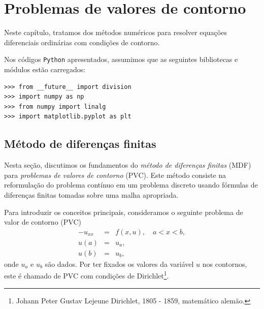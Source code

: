
%

\chapter{Problemas de valores de contorno}

Neste capítulo, tratamos dos métodos numéricos para resolver equações diferenciais ordinárias com condições de contorno.

\ifispython
Nos códigos \verb+Python+ apresentados, assumimos que as seguintes bibliotecas e módulos estão carregados:
\begin{verbatim}
>>> from __future__ import division
>>> import numpy as np
>>> from numpy import linalg
>>> import matplotlib.pyplot as plt
\end{verbatim}
\fi

\section{Método de diferenças finitas}

Nesta seção, discutimos os fundamentos do \emph{método de diferenças finitas} (MDF) para \emph{problemas de valores de contorno} (PVC). Este método consiste na reformulação do problema contínuo em um problema discreto usando fórmulas de diferenças finitas tomadas sobre uma malha apropriada.

Para introduzir os conceitos principais, consideramos o seguinte problema de valor de contorno (PVC)
\begin{eqnarray}
    -u_{xx} &=& f(x, u),\quad a < x < b,\label{eq:pvc1-eq}\\
    u(a) &=& u_a,\label{eq:pvc1-bc1}\\
    u(b) &=& u_b,\label{eq:pvc1-bc2}
\end{eqnarray}
onde $u_a$ e $u_b$ são dados. Por ter fixados os valores da variável $u$ nos contornos, este é chamado de PVC com condições de Dirichlet\footnote{Johann Peter Gustav Lejeune Dirichlet, 1805 - 1859, matemático alemão.}.

